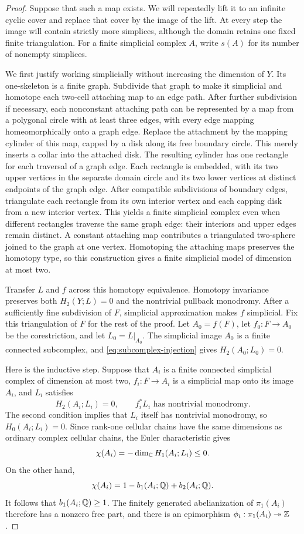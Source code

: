 \begin{proof}
Suppose that such a map exists.  We will repeatedly lift it to an
infinite cyclic cover and replace that cover by the image of the lift.
At every step the image will contain strictly more simplices, although
the domain retains one fixed finite triangulation.  For a finite
simplicial complex $A$, write $s(A)$ for its number of nonempty simplices.

We first justify working simplicially without increasing the dimension
of $Y$.  Its one-skeleton is a finite graph.  Subdivide that graph to
make it simplicial and homotope each two-cell attaching map to an edge
path.  After further subdivision if necessary, each nonconstant
attaching path can be represented by a map from a polygonal circle
with at least three edges, with every edge mapping homeomorphically
onto a graph edge.  Replace the attachment by the mapping cylinder of this
map, capped by a disk along its free boundary circle.  This merely
inserts a collar into the attached disk.  The resulting cylinder has
one rectangle for each traversal of a graph edge.  Each rectangle is
embedded, with its two upper vertices in the separate domain circle
and its two lower vertices at distinct endpoints of the graph edge.
After compatible subdivisions of boundary edges, triangulate each
rectangle from its own interior vertex and each capping disk from a
new interior vertex.  This yields a finite simplicial complex even
when different rectangles traverse the same graph edge: their
interiors and upper edges remain distinct.  A constant attaching map
contributes a triangulated two-sphere joined to the graph at one
vertex.  Homotoping the attaching maps preserves the homotopy type,
so this construction gives a finite simplicial model of dimension at
most two.

Transfer $L$ and $f$ across this homotopy equivalence.  Homotopy
invariance preserves both $H_2(Y;L)=0$ and the nontrivial pullback
monodromy.  After a sufficiently fine subdivision of $F$, simplicial
approximation makes $f$ simplicial.  Fix this triangulation of $F$
for the rest of the proof.  Let $A_0=f(F)$, let $f_0:F\to A_0$ be the
corestriction, and let $L_0=L|_{A_0}$.  The simplicial image $A_0$ is
a finite connected subcomplex, and
\eqref{eq:subcomplex-injection} gives $H_2(A_0;L_0)=0$.

Here is the inductive step.  Suppose that $A_i$ is a finite connected
simplicial complex of dimension at most two, $f_i:F\to A_i$ is a
simplicial map onto its image $A_i$, and $L_i$ satisfies
\begin{equation}
  H_2(A_i;L_i)=0,
  \qquad f_i^*L_i\text{ has nontrivial monodromy}.
  \label{eq:tower-invariants}
\end{equation}
The second condition implies that $L_i$ itself has nontrivial
monodromy, so $H_0(A_i;L_i)=0$.  Since rank-one cellular chains have
the same dimensions as ordinary complex cellular chains, the Euler
characteristic gives
\[
  \chi(A_i)=-\dim_\mathbb C H_1(A_i;L_i)\leq0.
\]
On the other hand,
\[
  \chi(A_i)=1-b_1(A_i;\mathbb Q)+b_2(A_i;\mathbb Q).
\]
It follows that $b_1(A_i;\mathbb Q)\geq1$.  The finitely generated
abelianization of $\pi_1(A_i)$ therefore has a nonzero free part,
and there is an epimorphism
$\phi_i:\pi_1(A_i)\twoheadrightarrow\mathbb Z$.


\end{proof}
